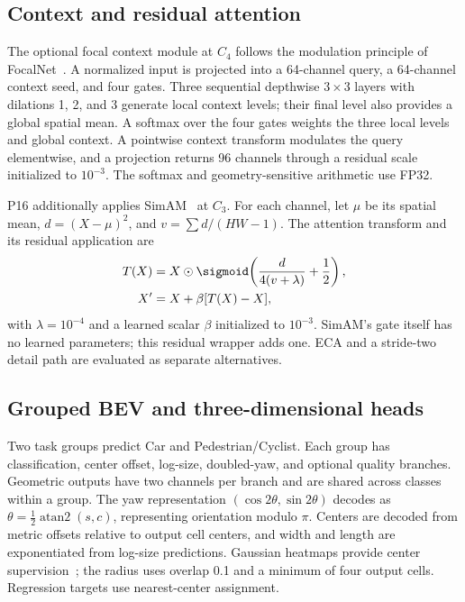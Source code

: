 \subsection{Context and residual attention}
The optional focal context module at $C_4$ follows the modulation principle of FocalNet~\cite{yang2022focalnet}. A normalized input is projected into a 64-channel query, a 64-channel context seed, and four gates. Three sequential depthwise $3\times3$ layers with dilations 1, 2, and 3 generate local context levels; their final level also provides a global spatial mean. A softmax over the four gates weights the three local levels and global context. A pointwise context transform modulates the query elementwise, and a projection returns 96 channels through a residual scale initialized to $10^{-3}$. The softmax and geometry-sensitive arithmetic use FP32.

P16 additionally applies SimAM~\cite{yang2021simam} at $C_3$. For each channel, let $\mu$ be its spatial mean, $d=(X-\mu)^2$, and $v=\sum d/(HW-1)$. The attention transform and its residual application are
\begin{equation}
 \begin{aligned}
 T(X)&=X\odot\sigmoid\!\left(\frac{d}{4(v+\lambda)}+\frac12\right),\\
 X'&=X+\beta[T(X)-X],
 \end{aligned}
\end{equation}
with $\lambda=10^{-4}$ and a learned scalar $\beta$ initialized to $10^{-3}$. SimAM's gate itself has no learned parameters; this residual wrapper adds one. ECA and a stride-two detail path are evaluated as separate alternatives.

\subsection{Grouped BEV and three-dimensional heads}
\label{sec:heads}
Two task groups predict Car and Pedestrian/Cyclist. Each group has classification, center offset, log-size, doubled-yaw, and optional quality branches. Geometric outputs have two channels per branch and are shared across classes within a group. The yaw representation $(\cos 2\theta,\sin 2\theta)$ decodes as $\theta=\tfrac12\operatorname{atan2}(s,c)$, representing orientation modulo $\pi$. Centers are decoded from metric offsets relative to output cell centers, and width and length are exponentiated from log-size predictions. Gaussian heatmaps provide center supervision~\cite{zhou2019objects}; the radius uses overlap 0.1 and a minimum of four output cells. Regression targets use nearest-center assignment.

